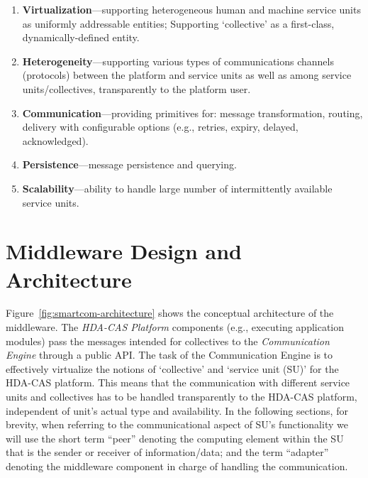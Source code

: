       \begin{enumerate}
        \item \textbf{Virtualization}---supporting heterogeneous human and machine service units as uniformly addressable entities; Supporting `collective' as a first-class, dynamically-defined entity.
        \item \textbf{Heterogeneity}---supporting various types of communications channels (protocols) between the platform and service units as well as among service units/collectives, transparently to the platform user.
        \item \textbf{Communication}---providing primitives for: message transformation, routing, delivery with configurable options (e.g., retries, expiry, delayed, acknowledged).
        \item \textbf{Persistence}---message persistence and querying.
        \item \textbf{Scalability}---ability to handle large number of intermittently available service units.
      \end{enumerate}
      


\section{Middleware Design and Architecture}
\label{sec:middleware}


  Figure~\ref{fig:smartcom-architecture} shows the conceptual architecture of the \mdl{} middleware. The \emph{HDA-CAS Platform} components (e.g., executing application modules) pass the messages intended for collectives to the \emph{Communication Engine} through a public API. The task of the Communication Engine is to effectively virtualize the notions of `collective' and `service unit (SU)' for the HDA-CAS platform. This means that the communication with different service units and collectives has to be handled transparently to the HDA-CAS platform, independent of unit's actual type and availability. 
  In the following sections, for brevity, when referring to the communicational aspect of SU's functionality we will use the short term ``peer'' denoting the computing element within the SU that is the sender or receiver of information/data; and the term ``adapter'' denoting the middleware component in charge of handling the communication.

